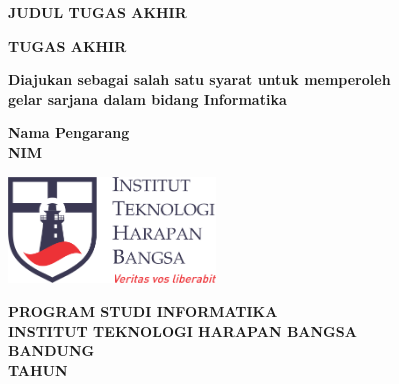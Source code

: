 \begin{titlepage}
	\begin{center}
		\vspace*{0cm}
		
		{\large \bfseries JUDUL TUGAS AKHIR}
			
		\vspace{3cm}
		
	 	{\large \bfseries TUGAS AKHIR}
	 	
	 	\vspace{1cm}
	 	{ \bfseries Diajukan sebagai salah satu syarat untuk memperoleh \\
	 				gelar sarjana dalam bidang Informatika }
 		

		\vspace{1cm}
		
		{ \bfseries Nama Pengarang \\ NIM }
		
	
		\vspace*{\fill} 
		
		\includegraphics[width=5.5cm]{img/ithb.png}
	
		\vspace{2.5cm}

		{\large \bfseries PROGRAM STUDI INFORMATIKA \\
		INSTITUT TEKNOLOGI HARAPAN BANGSA \\
		BANDUNG\\
		TAHUN}
		
		\vspace{1cm}
	\end{center}
\end{titlepage}